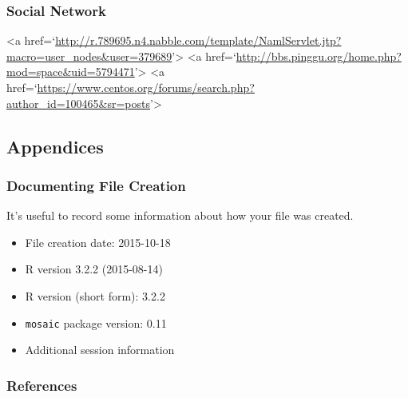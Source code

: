 \documentclass[]{article}
\providecommand{\tightlist}{%
  \setlength{\itemsep}{0pt}\setlength{\parskip}{0pt}}
\begin{document}
\subsubsection{Social Network}\label{social-network}

 \textless{}a
href=`\url{http://r.789695.n4.nabble.com/template/NamlServlet.jtp?macro=user_nodes\&user=379689}'\textgreater{}
\textless{}a
href=`\url{http://bbs.pinggu.org/home.php?mod=space\&uid=5794471}'\textgreater{}
\textless{}a
href=`\url{https://www.centos.org/forums/search.php?author_id=100465\&sr=posts}'\textgreater{}

\subsection{Appendices}\label{appendices}

\subsubsection{Documenting File
Creation}\label{documenting-file-creation}

It's useful to record some information about how your file was created.

\begin{itemize}
\tightlist
\item
  File creation date: 2015-10-18
\item
  R version 3.2.2 (2015-08-14)
\item
  R version (short form): 3.2.2
\item
  \texttt{mosaic} package version: 0.11
\item
  Additional session information
\end{itemize}

\subsubsection{References}\label{references}
\end{document}
